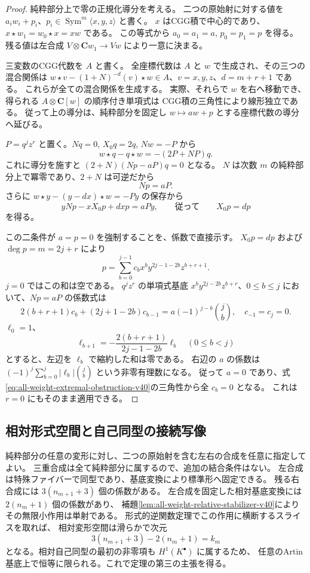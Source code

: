 \begin{proof}
純粋部分上で零の正規化導分を考える。
二つの原始射に対する値を $a_iw_i+p_i$、$p_i\in\operatorname{Sym}^m\langle x,y,z\rangle$ と書く。
$x$ はCGG積で中心的であり、$x\star w_1=w_0\star x=xw$ である。
この等式から $a_0=a_1=a$, $p_0=p_1=p$ を得る。
残る値は左合成 $V\otimes\mathbf Cw_1\to Vw$ により一意に決まる。

三変数のCGG代数を $A$ と書く。
全座標代数は $A$ と $w$ で生成され、その三つの混合関係は
$w\star v-(1+N)^{-d}(v)\star w\in A$、$v=x,y,z$、$d=m+r+1$ である。
これらが全ての混合関係を生成する。
実際、それらで $w$ を右へ移動でき、得られる $A\otimes\mathbf C[w]$ の順序付き単項式は
CGG積の三角性により線形独立である。
従って上の導分は、純粋部分を固定し $w\mapsto aw+p$ とする座標代数の導分へ延びる。

$P=q^jz^r$ と置く。$Nq=0$, $X_0q=2q$, $Nw=-P$ から
\[
 w\star q-q\star w=-(2P+NP)q.
\]
これに導分を施すと
$(2+N)(Np-aP)q=0$ となる。
$N$ は次数 $m$ の純粋部分上で冪零であり、$2+N$ は可逆だから
\[
 Np=aP.
\]
さらに
$w\star y-(y-dx)\star w=-Py$ の保存から
\[
 yNp-xX_0p+dxp=aPy,
 \qquad\text{従って}\qquad X_0p=dp
\]
を得る。

この二条件が $a=p=0$ を強制することを、係数で直接示す。
$X_0p=dp$ および $\deg p=m=2j+r$ により
\[
 p=\sum_{b=0}^{j-1}c_b x^b y^{2j-1-2b}z^{b+r+1}.
\]
$j=0$ ではこの和は空である。
$q^jz^r$ の単項式基底
$x^b y^{2j-2b}z^{b+r}$、$0\le b\le j$ において、$Np=aP$ の係数式は
\begin{equation}
 2(b+r+1)c_b+(2j+1-2b)c_{b-1}
   =a(-1)^{j-b}\binom jb,
 \quad c_{-1}=c_j=0.
 \label{eq:all-weight-extremal-obstruction-v40}
\end{equation}
$\ell_0=1$、
\[
 \ell_{b+1}=-\frac{2(b+r+1)}{2j-1-2b}\ell_b
 \quad (0\le b<j)
\]
とすると、左辺を $\ell_b$ で縮約した和は零である。
右辺の $a$ の係数は
$(-1)^j\sum_{b=0}^j|\ell_b|\binom jb$ という非零有理数になる。
従って $a=0$ であり、式\eqref{eq:all-weight-extremal-obstruction-v40}の三角性から全 $c_b=0$ となる。
これは $r=0$ にもそのまま適用できる。
\end{proof}

\subsection{相対形式空間と自己同型の接続写像}

純粋部分の任意の変形に対し、二つの原始射を含む左右の合成を任意に指定してよい。
三重合成は全て純粋部分に属するので、追加の結合条件はない。
左合成は特殊ファイバーで同型であり、基底変換により標準形へ固定できる。
残る右合成には $3(n_{m+1}+3)$ 個の係数がある。
左合成を固定した相対基底変換には $2(n_m+1)$ 個の係数があり、
補題\ref{lem:all-weight-relative-stabilizer-v40}によりその無限小作用は単射である。
形式的逆関数定理でこの作用に横断するスライスを取れば、
相対変形空間は滑らかで次元
\[
 3(n_{m+1}+3)-2(n_m+1)=k_m
\]
となる。相対自己同型の最初の非零項も $H^1(K^\bullet)$ に属するため、
任意のArtin基底上で恒等に限られる。これで定理の第三の主張を得る。


